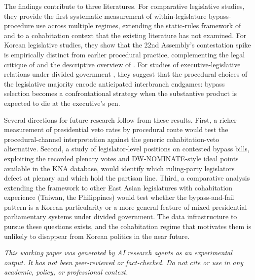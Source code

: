 \documentclass[11pt]{article}
\begin{document}
The findings contribute to three literatures. For comparative legislative studies, they provide the first systematic measurement of within-legislature bypass-procedure use across multiple regimes, extending the static-rules framework of \citet{crosson2018} and \citet{coxmccubbins2005} to a cohabitation context that the existing literature has not examined. For Korean legislative studies, they show that the 22nd Assembly's contestation spike is empirically distinct from earlier procedural practice, complementing the legal critique of \citet{parkpy2026} and the descriptive overview of \citet{jang2021}. For studies of executive-legislative relations under divided government \citep{mayhew1991, kriner2008, leehs2012}, they suggest that the procedural choices of the legislative majority encode anticipated interbranch endgames: bypass selection becomes a confrontational strategy when the substantive product is expected to die at the executive's pen.

Several directions for future research follow from these results. First, a richer measurement of presidential veto rates by procedural route would test the procedural-channel interpretation against the generic cohabitation-veto alternative. Second, a study of legislator-level positions on contested bypass bills, exploiting the recorded plenary votes and DW-NOMINATE-style ideal points available in the KNA database, would identify which ruling-party legislators defect at plenary and which hold the partisan line. Third, a comparative analysis extending the framework to other East Asian legislatures with cohabitation experience (Taiwan, the Philippines) would test whether the bypass-and-fail pattern is a Korean particularity or a more general feature of mixed presidential-parliamentary systems under divided government. The data infrastructure to pursue these questions exists, and the cohabitation regime that motivates them is unlikely to disappear from Korean politics in the near future.

\bigskip
\noindent\textit{This working paper was generated by AI research agents as an experimental output. It has not been peer-reviewed or fact-checked. Do not cite or use in any academic, policy, or professional context.}



\end{document}
